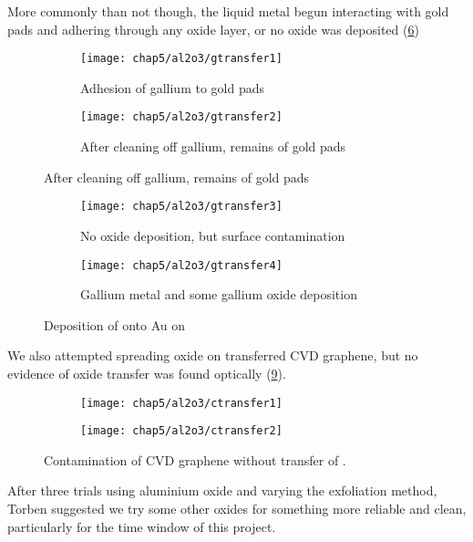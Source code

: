 \documentclass[../Matt_Gebert_Honours_Thesis.tex]{subfiles}
\begin{document}
		More commonly than not though, the liquid metal begun interacting with gold pads and adhering through any oxide layer, or no oxide was deposited (\cref{fig:transfer_al_on_au&si})
		\begin{figure}[H]
			\begin{subfigure}[t]{0.5\textwidth}
				\centering
				\texttt{[image: chap5/al2o3/gtransfer1]}
				\caption{Adhesion of gallium to gold pads}\label{fig:al2o3_g1}
			\end{subfigure}
			\begin{subfigure}[t]{0.5\textwidth}
				\centering
				\texttt{[image: chap5/al2o3/gtransfer2]}
				\caption{After cleaning off gallium, remains of gold pads}\label{fig:al2o3_g2}
			\end{subfigure}
		\end{figure}
		\begin{figure}[H]
			\ContinuedFloat
			\begin{subfigure}[t]{0.5\textwidth}
				\centering
				\texttt{[image: chap5/al2o3/gtransfer3]}
				\caption{No oxide deposition, but surface contamination}\label{fig:al2o3_g3}
			\end{subfigure}
			\begin{subfigure}[t]{0.5\textwidth}
				\centering
				\texttt{[image: chap5/al2o3/gtransfer4]}
				\caption{Gallium metal and some gallium oxide deposition}\label{fig:al2o3_g4}
			\end{subfigure}
			\caption[\aluminimumoxide{} stamped on \silicondioxide{}]{Deposition of \aluminimumoxide{} onto Au on \silicondioxide{}}\label{fig:transfer_al_on_au&si}
		\end{figure}
		We also attempted spreading oxide on transferred CVD graphene, but no evidence of oxide transfer was found optically (\cref{fig:transfer_al_on_cvd}).
		\begin{figure}[H]
			\begin{subfigure}[t]{0.5\textwidth}
				\centering
				\texttt{[image: chap5/al2o3/ctransfer1]}
				\caption{}\label{fig:al2o3_c1}
			\end{subfigure}
			\begin{subfigure}[t]{0.5\textwidth}
				\centering
				\texttt{[image: chap5/al2o3/ctransfer2]}
				\caption{}\label{fig:al2o3_c2}
			\end{subfigure}
			\caption[\aluminimumoxide{} stamped on CVD graphene \& \silicondioxide{}]{Contamination of CVD graphene without transfer of \aluminimumoxide{}.}\label{fig:transfer_al_on_cvd}
		\end{figure}
		After three trials using aluminium oxide and varying the exfoliation method, Torben suggested we try some other oxides for something more reliable and clean, particularly for the time window of this project. 
	
\end{document}
